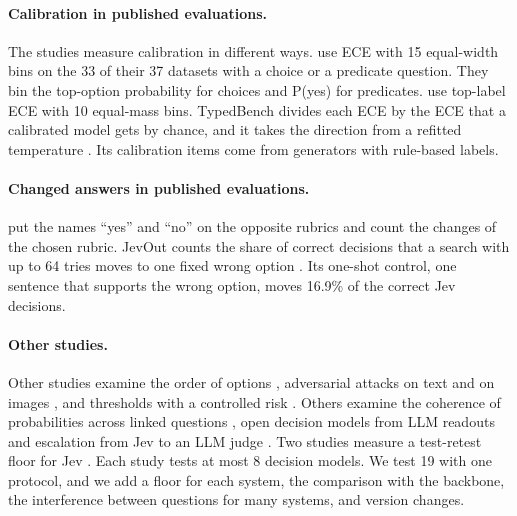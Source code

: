\documentclass[11pt]{article}
\begin{document}
\paragraph{Calibration in published evaluations.}
The studies measure calibration in different ways. \citet{deusser2026evaluating} use ECE with 15 equal-width bins on the 33 of their 37 datasets with a choice or a predicate question. They bin the top-option probability for choices and P(yes) for predicates. \citet{rafe2026benchmarking} use top-label ECE with 10 equal-mass bins. TypedBench divides each ECE by the ECE that a calibrated model gets by chance, and it takes the direction from a refitted temperature \citep{sharma2026typedbench}. Its calibration items come from generators with rule-based labels.

\paragraph{Changed answers in published evaluations.}
\citet{rafe2026benchmarking} put the names ``yes'' and ``no'' on the opposite rubrics and count the changes of the chosen rubric. JevOut counts the share of correct decisions that a search with up to 64 tries moves to one fixed wrong option \citep{xu2026jevout}. Its one-shot control, one sentence that supports the wrong option, moves 16.9\% of the correct Jev decisions.

\paragraph{Other studies.}
Other studies examine the order of options \citep{huang2026consider}, adversarial attacks on text \citep{hu2026jevadvbench} and on images \citep{lan2026decisionrobust}, and thresholds with a controlled risk \citep{messoudi2026calibration}. Others examine the coherence of probabilities across linked questions \citep{li2026beyond}, open decision models from LLM readouts \citep{geuter2026releasing,zhang2026anyjev} and escalation from Jev to an LLM judge \citep{li2026jevasajudge}. Two studies measure a test-retest floor for Jev \citep{rafe2026benchmarking,li2026beyond}. Each study tests at most 8 decision models. We test 19 with one protocol, and we add a floor for each system, the comparison with the backbone, the interference between questions for many systems, and version changes.
\end{document}
